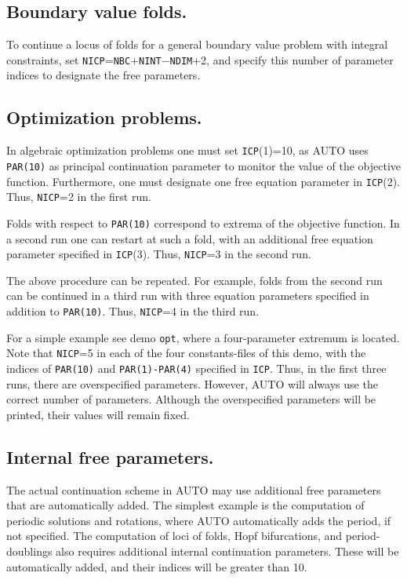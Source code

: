 \documentclass[12pt]{report}
\begin{document}
\subsection{ Boundary value folds.}
To continue a locus of folds for a general boundary value problem
with integral constraints, set {\tt NICP}={\tt NBC}+{\tt NINT}$-${\tt NDIM}+2, 
and specify this number of parameter indices to designate the free parameters.

\subsection{ Optimization problems.}
In algebraic optimization problems one must set {\tt ICP}(1)=10, 
as {\cal AUTO} uses {\tt PAR(10)} as principal continuation parameter
to monitor the value of the objective function.
Furthermore, one must designate one free equation parameter in {\tt ICP}(2). 
Thus, {\tt NICP}=2 in the first run.

Folds with respect to {\tt PAR(10)} correspond to extrema of the objective function.
In a second run one can restart at such a fold, with an additional
free equation parameter specified in {\tt ICP}(3).
Thus, {\tt NICP}=3 in the second run.

The above procedure can be repeated.
For example, folds from the second run can be continued in a third run
with three equation parameters specified in addition to {\tt PAR(10)}.
Thus, {\tt NICP}=4 in the third run.

For a simple example see demo {\tt opt}, where a four-parameter extremum
is located.
Note that {\tt NICP}=5 in each of the four constants-files of this demo, 
with the indices of {\tt PAR(10)} and {\tt PAR(1)-PAR(4)} specified in {\tt ICP}.
Thus, in the first three runs, there are overspecified parameters.
However, {\cal AUTO} will always use the correct number of parameters.
Although the overspecified parameters will be printed, their values will
remain fixed. 

\subsection{ Internal free parameters.}
The actual continuation scheme in {\cal AUTO} may use additional free
parameters that are automatically added.
The simplest example is the computation of periodic solutions and rotations,
where {\cal AUTO} automatically adds the period, if not specified.
The computation of loci of folds, Hopf bifurcations, and period-doublings
also requires additional internal continuation parameters.
These will be automatically added, and their indices will be greater
than 10.
\end{document}
